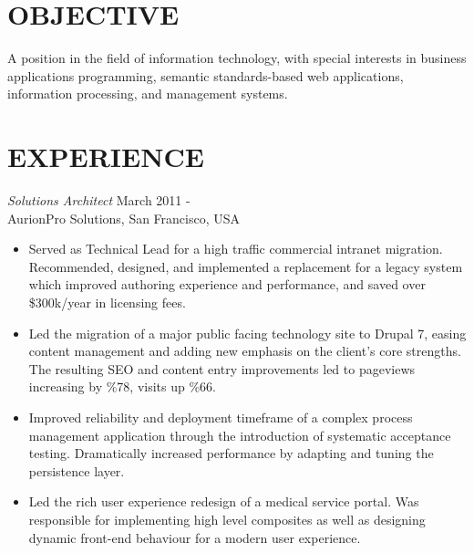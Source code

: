 \documentclass[line,margin]{res}
\begin{document}
\vspace{10mm}

\address{350 Pierce Street, San Francisco, CA}
\address{cell: (415) 967-1235 email: degibb@gmail.com}

 
\begin{resume}
\section{OBJECTIVE}       A position in the field of information technology, with special 
                interests in business applications programming, semantic standards-based web applications,
                information processing, and management systems. 
 


\section{EXPERIENCE} 
{\sl Solutions Architect} \hfill March 2011 - \\
                AurionPro Solutions, 
                San Francisco, USA
                 \begin{itemize}  \itemsep -2pt %
                 \item Served as Technical Lead for a high traffic commercial
                   intranet migration. Recommended, designed, and implemented a
                   replacement for a legacy system which improved authoring
                   experience and performance, and saved over \$300k/year in
                   licensing fees.
                 \item Led the migration of a major public facing technology
                 site to Drupal 7, easing content management and adding new
                 emphasis on the client's core strengths. The resulting
                 SEO and content entry improvements led to
                 pageviews increasing by \%78, visits up \%66.
                 \item Improved reliability and deployment timeframe of a
                 complex process management application through the introduction
                 of systematic acceptance testing. Dramatically increased
                 performance by adapting and tuning the persistence layer.
                 \item Led the rich user experience redesign of a medical
                 service portal. Was responsible for implementing high level
                 composites as well as designing dynamic front-end behaviour
                 for a modern user experience.
                 \end{itemize}
                    

\end{resume}
\end{document}
